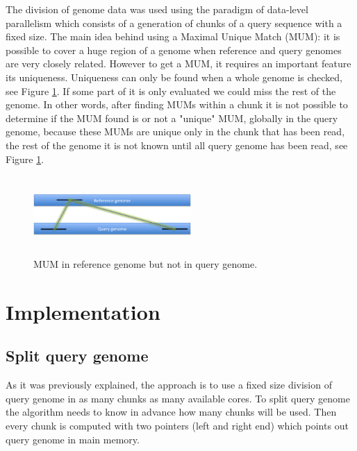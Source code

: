 \documentclass[3p,times]{elsarticle}
\begin{document}
The division of genome data was used using the paradigm of data-level parallelism which consists of a generation of chunks of a query sequence with a fixed size. 
The main idea behind using a Maximal Unique Match (MUM): it is possible to cover a huge region of a genome when reference and query genomes are very closely related. However 
to get a MUM, it requires an important feature its uniqueness. 
Uniqueness can only be found when a whole genome is checked, see Figure \ref{Whole-MUM}. If some part of it is only evaluated we could miss the rest of the genome. In other words, after finding MUMs within a chunk it is not possible to determine if the MUM found is or not a "unique" MUM, globally in the query genome,  because these MUMs are unique only in the chunk that has been read, the rest of the genome it is not known until all query genome has been read, see Figure \ref{Whole-MUM}.\\
\begin{figure}[htb]  
\begin{center} 
  \includegraphics[width=6cm,height=3cm]{Whole-MUM.png}
\end{center} 
\caption{MUM in reference genome but not in query genome.} 
\label{Whole-MUM} 
\end{figure}
\section{Implementation} 
\label{implementation}
\subsection*{Split query genome}  
As it was previously explained, the approach is to use a fixed size division of query genome in as many chunks as  many available cores. 
To split query genome the algorithm needs to know in advance how many chunks will be used. Then every chunk is computed with two pointers (left and right end)
which points out query genome in main memory.
\end{document}
